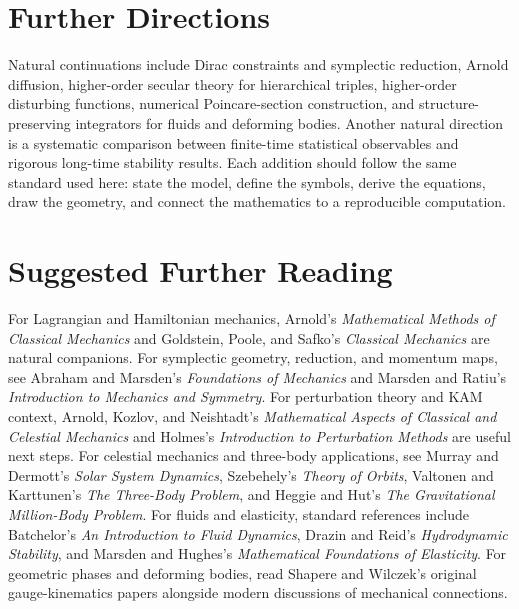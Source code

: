 \documentclass[11pt]{book}
\begin{document}
\mainmatter










\appendix





\backmatter
\chapter*{Further Directions}

Natural continuations include Dirac constraints and symplectic reduction,
Arnold diffusion, higher-order secular theory for hierarchical triples,
higher-order disturbing functions, numerical Poincare-section construction,
and structure-preserving integrators for fluids and deforming bodies.  Another
natural direction is a systematic comparison between finite-time statistical
observables and rigorous long-time stability results.  Each addition should
follow the same standard used here: state the model, define the symbols, derive
the equations, draw the geometry, and connect the mathematics to a
reproducible computation.

\chapter*{Suggested Further Reading}

For Lagrangian and Hamiltonian mechanics, Arnold's \emph{Mathematical Methods
of Classical Mechanics} and Goldstein, Poole, and Safko's \emph{Classical
Mechanics} are natural companions. For symplectic geometry, reduction, and
momentum maps, see Abraham and Marsden's \emph{Foundations of Mechanics} and
Marsden and Ratiu's \emph{Introduction to Mechanics and Symmetry}. For
perturbation theory and KAM context, Arnold, Kozlov, and Neishtadt's
\emph{Mathematical Aspects of Classical and Celestial Mechanics} and Holmes's
\emph{Introduction to Perturbation Methods} are useful next steps. For
celestial mechanics and three-body applications, see Murray and Dermott's
\emph{Solar System Dynamics}, Szebehely's \emph{Theory of Orbits}, Valtonen
and Karttunen's \emph{The Three-Body Problem}, and Heggie and Hut's
\emph{The Gravitational Million-Body Problem}. For fluids and elasticity,
standard references include Batchelor's \emph{An Introduction to Fluid
Dynamics}, Drazin and Reid's \emph{Hydrodynamic Stability}, and Marsden and
Hughes's \emph{Mathematical Foundations of Elasticity}. For geometric phases
and deforming bodies, read Shapere and Wilczek's original gauge-kinematics
papers alongside modern discussions of mechanical connections.
\end{document}
